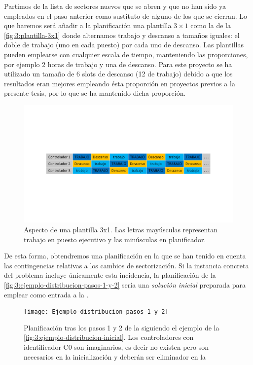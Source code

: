 Partimos de la lista de sectores nuevos que se abren y que no han sido ya empleados en el paso anterior como sustituto de alguno de los que se cierran. Lo que haremos será añadir a la planificación una plantilla $3\times1$ como la de la 
\autoref{fig:3:plantilla-3x1} donde alternamos trabajo y descanso a tamaños iguales: el doble de trabajo (uno en cada puesto) por cada uno de descanso. Las plantillas pueden emplearse con cualquier escala de tiempo, manteniendo las proporciones, por ejemplo 2 horas de trabajo y una de descanso.
Para este proyecto se ha utilizado un tamaño de 6 slots de descanso (12 de trabajo) debido a que los resultados eran mejores empleando ésta proporción en proyectos previos a la presente tesis, por lo que se ha mantenido dicha proporción.
\\

\begin{figure}
	\centering
	\includegraphics[width=0.9\linewidth]{capitulos/Capitulo3-Metodologia-propuesta/recursos/Plantilla-3x1}
	\caption[Aspecto de una plantilla 3x1]{Aspecto de una plantilla 3x1. Las letras mayúsculas representan trabajo en 
	puesto ejecutivo y las minúsculas en planificador.}
	\label{fig:3:plantilla-3x1}
\end{figure}

De esta forma, obtendremos una planificación en la que se han tenido en cuenta las contingencias relativas a los cambios de sectorización. Si la instancia concreta del problema incluye únicamente esta incidencia, la planificación de la \autoref{fig:3:ejemplo-distribucion-pasos-1-y-2} sería una \textit{solución inicial} preparada para emplear como entrada a la \fasedos{}.

\begin{figure} 
	\centering
	\texttt{[image: Ejemplo-distribucion-pasos-1-y-2]}
	\caption[Planificación tras los pasos 1 y 2 de la Fase 1]{Planificación tras los pasos 1 y 2 de la \faseuno{} siguiendo el ejemplo de la \autoref{fig:3:ejemplo-distribucion-inicial}. Los controladores con identificador C0 son imaginarios, es decir no existen pero son necesarios en la inicialización y deberán ser eliminador en la \fasedos{}} 
	\label{fig:3:ejemplo-distribucion-pasos-1-y-2}
\end{figure}

